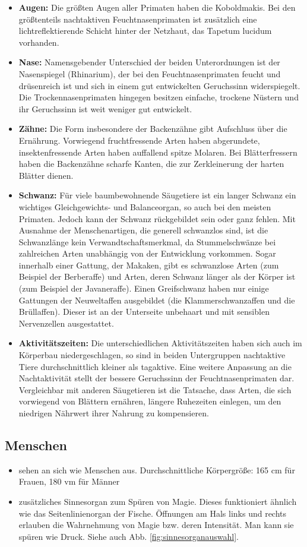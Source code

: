 \begin{itemize}
	\item \textbf{Augen:} Die größten Augen aller Primaten haben die Koboldmakis. Bei den größtenteils nachtaktiven Feuchtnasenprimaten ist zusätzlich eine lichtreflektierende Schicht hinter der Netzhaut, das Tapetum lucidum vorhanden.
	\item \textbf{Nase:} Namensgebender Unterschied der beiden Unterordnungen ist der Nasenspiegel (Rhinarium), der bei den Feuchtnasenprimaten feucht und drüsenreich ist und sich in einem gut entwickelten Geruchssinn widerspiegelt. Die Trockennasenprimaten hingegen besitzen einfache, trockene Nüstern und ihr Geruchssinn ist weit weniger gut entwickelt. 
	\item \textbf{Zähne:} Die Form insbesondere der Backenzähne gibt Aufschluss über die Ernährung. Vorwiegend fruchtfressende Arten haben abgerundete, insektenfressende Arten haben auffallend spitze Molaren. Bei Blätterfressern haben die Backenzähne scharfe Kanten, die zur Zerkleinerung der harten Blätter dienen. 
	\item \textbf{Schwanz:} Für viele baumbewohnende Säugetiere ist ein langer Schwanz ein wichtiges Gleichgewichts- und Balanceorgan, so auch bei den meisten Primaten. Jedoch kann der Schwanz rückgebildet sein oder ganz fehlen. Mit Ausnahme der Menschenartigen, die generell schwanzlos sind, ist die Schwanzlänge kein Verwandtschaftsmerkmal, da Stummelschwänze bei zahlreichen Arten unabhängig von der Entwicklung vorkommen. Sogar innerhalb einer Gattung, der Makaken, gibt es schwanzlose Arten (zum Beispiel der Berberaffe) und Arten, deren Schwanz länger als der Körper ist (zum Beispiel der Javaneraffe). Einen Greifschwanz haben nur einige Gattungen der Neuweltaffen ausgebildet (die Klammerschwanzaffen und die Brüllaffen). Dieser ist an der Unterseite unbehaart und mit sensiblen Nervenzellen ausgestattet.
	\item \textbf{Aktivitätszeiten:} Die unterschiedlichen Aktivitätszeiten haben sich auch im Körperbau niedergeschlagen, so sind in beiden Untergruppen nachtaktive Tiere durchschnittlich kleiner als tagaktive. Eine weitere Anpassung an die Nachtaktivität stellt der bessere Geruchssinn der Feuchtnasenprimaten dar. Vergleichbar mit anderen Säugetieren ist die Tatsache, dass Arten, die sich vorwiegend von Blättern ernähren, längere Ruhezeiten einlegen, um den niedrigen Nährwert ihrer Nahrung zu kompensieren. 
\end{itemize}


\subsection{Menschen} \label{rasse:mensch}
\begin{itemize}
	\item sehen an sich wie Menschen aus. Durchschnittliche Körpergröße: 165 cm für Frauen, 180 vm für Männer
	\item zusätzliches Sinnesorgan zum Spüren von Magie. Dieses funktioniert ähnlich wie das Seitenlinienorgan der Fische. Öffnungen am Hals links und rechts erlauben die Wahrnehmung von Magie bzw. deren Intensität. Man kann sie spüren wie Druck. Siehe auch Abb. \ref{fig:sinnesorganauswahl}.
\end{itemize}


